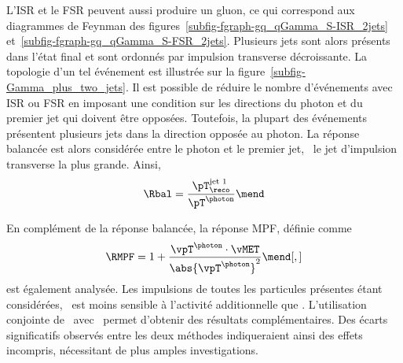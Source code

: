 \par L'ISR et le FSR peuvent aussi produire un gluon, ce qui correspond aux diagrammes de Feynman des figures~\ref{subfig-fgraph-gq_qGamma_S-ISR_2jets} et~\ref{subfig-fgraph-gq_qGamma_S-FSR_2jets}.
Plusieurs jets sont alors présents dans l'état final et sont ordonnés par impulsion transverse décroissante.
La topologie d'un tel événement est illustrée sur la figure~\ref{subfig-Gamma_plus_two_jets}.
Il est possible de réduire le nombre d'événements avec ISR ou FSR en imposant une condition sur les directions du photon et du premier jet qui doivent être opposées.
Toutefois, la plupart des événements présentent plusieurs jets dans la direction opposée au photon.
La réponse balancée est alors considérée entre le photon et le premier jet, \ie\ le jet d'impulsion transverse la plus grande. Ainsi,
\begin{equation}
\Rbal = \frac{\pT_\reco^\text{jet 1}}{\pT^{\photon}}
\mend
\end{equation}
\par En complément de la réponse balancée, la réponse MPF, définie comme
\begin{equation}
\RMPF = 1 + \frac{\vpT^{\photon}\cdot\vMET}{\abs{\vpT^{\photon}}^2}
\mend[,]
\end{equation}
est également analysée.
Les impulsions de toutes les particules présentes étant considérées, \RMPF\ est moins sensible à l'activité additionnelle que \Rbal.
L'utilisation conjointe de \RMPF\ avec \Rbal\ permet d'obtenir des résultats complémentaires.
Des écarts significatifs observés entre les deux méthodes indiqueraient ainsi des effets incompris, nécessitant de plus amples investigations.
